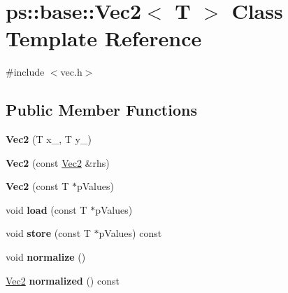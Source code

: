 \hypertarget{classps_1_1base_1_1Vec2}{}\section{ps\+:\+:base\+:\+:Vec2$<$ T $>$ Class Template Reference}
\label{classps_1_1base_1_1Vec2}


{\ttfamily \#include $<$vec.\+h$>$}

\subsection*{Public Member Functions}
\begin{DoxyCompactItemize}
\item 
\hypertarget{classps_1_1base_1_1Vec2_a46d716c24263488aa1df44335374c7dd}{}{\bfseries Vec2} (T x\+\_\+, T y\+\_\+)\label{classps_1_1base_1_1Vec2_a46d716c24263488aa1df44335374c7dd}

\item 
\hypertarget{classps_1_1base_1_1Vec2_a1fe26daa86abde821027bb5b17a25d1a}{}{\bfseries Vec2} (const \hyperlink{classps_1_1base_1_1Vec2}{Vec2} \&rhs)\label{classps_1_1base_1_1Vec2_a1fe26daa86abde821027bb5b17a25d1a}

\item 
\hypertarget{classps_1_1base_1_1Vec2_adb4da2eae9f689778f1fee47925a4028}{}{\bfseries Vec2} (const T $\ast$p\+Values)\label{classps_1_1base_1_1Vec2_adb4da2eae9f689778f1fee47925a4028}

\item 
\hypertarget{classps_1_1base_1_1Vec2_a3422a88f805299ac944d6774c9240ec0}{}void {\bfseries load} (const T $\ast$p\+Values)\label{classps_1_1base_1_1Vec2_a3422a88f805299ac944d6774c9240ec0}

\item 
\hypertarget{classps_1_1base_1_1Vec2_a1a462bdb77e1004901e30c9c5e7c45dc}{}void {\bfseries store} (const T $\ast$p\+Values) const \label{classps_1_1base_1_1Vec2_a1a462bdb77e1004901e30c9c5e7c45dc}

\item 
\hypertarget{classps_1_1base_1_1Vec2_a5efe8321c15342528c57570bca1f48e3}{}void {\bfseries normalize} ()\label{classps_1_1base_1_1Vec2_a5efe8321c15342528c57570bca1f48e3}

\item 
\hypertarget{classps_1_1base_1_1Vec2_ab626f986b91fb3b942d4ca1662216fe9}{}\hyperlink{classps_1_1base_1_1Vec2}{Vec2} {\bfseries normalized} () const \label{classps_1_1base_1_1Vec2_ab626f986b91fb3b942d4ca1662216fe9}


\end{DoxyCompactItemize}
